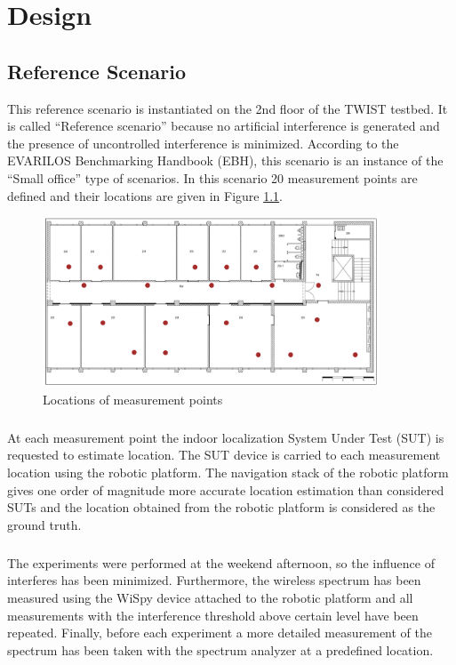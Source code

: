 \documentclass[11pt,a4paper,headinclude,footinclude,chapterprefix=on]{scrreprt}
\begin{document}
\chapter{Design} 
\section{Reference Scenario}\label{scene:ref} This reference scenario is instantiated on the 2nd floor of the TWIST testbed. It is called “Reference scenario” because no artificial interference is generated and the presence of uncontrolled interference is minimized. According to the EVARILOS Benchmarking Handbook (EBH), this scenario is an instance of the “Small office” type of scenarios. In this scenario 20 measurement points are defined and their locations are given in Figure \ref{fig:floor}. 
\begin{figure}
	[!h] \centering 
	\includegraphics[width=100mm]{Images/floor} \caption{Locations of measurement points} \label{fig:floor} 
\end{figure}

\paragraph{} At each measurement point the indoor localization System Under Test (SUT) is requested to estimate location. The SUT device is carried to each measurement location using the robotic platform. The navigation stack of the robotic platform gives one order of magnitude more accurate location estimation than considered SUTs and the location obtained from the robotic platform is considered as the ground truth.

\paragraph{} The experiments were performed at the weekend afternoon, so the influence of interferes has been minimized. Furthermore, the wireless spectrum has been measured using the WiSpy device attached to the robotic platform and all measurements with the interference threshold above certain level have been repeated. Finally, before each experiment a more detailed measurement of the spectrum has been taken with the spectrum analyzer at a predefined location.
\end{document}

